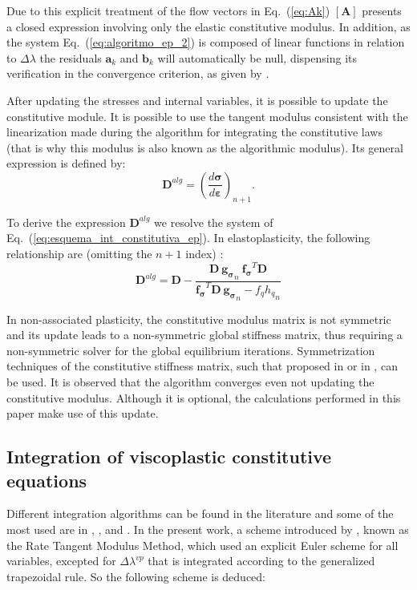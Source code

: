 \documentclass[Journal,letterpaper]{ascelike-new}
\newcommand{\All}{\boldsymbol A}
\newcommand{\al}{\boldsymbol a}
\newcommand{\bl}{\boldsymbol b}
\newcommand{\dfds}{\boldsymbol{f_\sigma}}
\newcommand{\dfdq}{{f_q}}
\newcommand{\dgds}{\boldsymbol{g_\sigma}}
\newcommand{\Dsdee}{\boldsymbol{D}}
\newcommand{\hl}{{h_q}}
\newcommand{\strain}{\boldsymbol{\varepsilon}}
\newcommand{\stress}{\boldsymbol{\sigma}}
\begin{document}
Due to this explicit treatment of the flow vectors in Eq.~(\ref{eq:Ak}) $\left[\All \right]$ presents a closed expression involving only the elastic constitutive modulus. In addition, as the system Eq.~(\ref{eq:algoritmo_ep_2}) is composed of linear functions in relation to $\Delta \lambda$ the residuals  $\al_k$ and $\bl_k$ will automatically be null, dispensing its verification in the convergence criterion, as given by . 

After updating the stresses and internal variables, it is possible to update the constitutive module. It is possible to use the tangent modulus consistent with the linearization made during the algorithm for integrating the constitutive laws (that is why this modulus is also known as the algorithmic modulus). Its general expression is defined by:
\begin{equation}
	\label{eq:D_alg1}
	\Dsdee^{alg} = \left(\dfrac{d\stress}{d\strain} \right)_{n+1}.
\end{equation}

To derive the expression $\Dsdee^{alg}$ we resolve the system of Eq.~(\ref{eq:esquema_int_constitutiva_ep}). In elastoplasticity, the following relationship are (omitting the $n+1$ index) \cite{belytschko2000}: 
\begin{equation}
	\label{eq:D_alg_ep}
	\Dsdee^{alg} = \Dsdee - \dfrac{\Dsdee~\dgds_n~\dfds^T \Dsdee}{\dfds^T\Dsdee~\dgds_n-\dfdq \hl_n}
\end{equation}

In non-associated plasticity, the constitutive modulus matrix is not symmetric and its update leads to a non-symmetric global stiffness matrix, thus requiring a non-symmetric solver for the global equilibrium iterations. Symmetrization techniques of the constitutive stiffness matrix, such that proposed in  or in , can be used. It is observed that the algorithm converges even not updating the constitutive modulus. Although it is optional, the calculations performed in this paper make use of this update.

\subsection{Integration of viscoplastic constitutive equations}

Different integration algorithms can be found in the literature and some of the most used are in , ,  and . In the present work, a scheme introduced by , known as the Rate Tangent Modulus Method, which used an explicit Euler scheme for all variables, excepted for $\Delta \lambda^{vp}$ that is integrated according to the generalized trapezoidal rule. So the following scheme is deduced:
\end{document}
